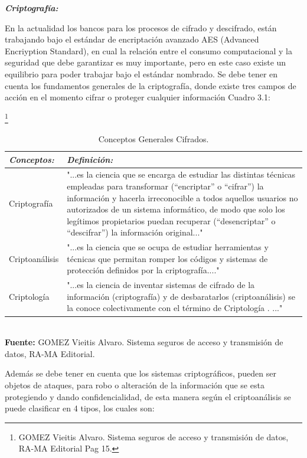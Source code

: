 \documentclass[a4paper,openright,12pt]{book}
\theoremstyle{definition}
\theoremstyle{remark}
\begin{document}
\textbf{\textit{Criptografía:}}

En la actualidad los bancos para los procesos de cifrado y descifrado, están trabajando bajo el estándar de encriptación avanzado AES (Advanced Encriyption Standard), en cual la relación entre el consumo computacional y la seguridad que debe garantizar es muy importante, pero en este caso existe un equilibrio para poder trabajar bajo el estándar nombrado. Se debe tener en cuenta los fundamentos generales de la criptografía, donde existe tres campos de acción en el momento cifrar o proteger cualquier información Cuadro 3.1: 

\begin{table}[ht]
\centering
\caption{Conceptos Generales Cifrados.}\footnote{GOMEZ Vieitis Alvaro. Sistema seguros de acceso y transmisión de datos, RA-MA Editorial Pag 15.}
\begin{tabular}{>{\centering\arraybackslash}m{3cm} >{\arraybackslash}m{9cm} }
\hline
\textbf{\textit{Conceptos:}} & \textbf{\textit{Definición:}} \\ \hline
Criptografía & "...es la ciencia que se encarga de estudiar las distintas técnicas empleadas para transformar (“encriptar” o “cifrar”) la información y hacerla irreconocible a todos aquellos usuarios no autorizados de un sistema informático, de modo que solo los legítimos propietarios puedan recuperar (“desencriptar” o “descifrar”) la información original..." \\ \hline
Criptoanálisis & "...es la ciencia que se ocupa de estudiar herramientas y técnicas que permitan romper los códigos y sistemas de protección definidos por la criptografía...." \\ \hline
Criptología & "...es la ciencia de inventar sistemas de cifrado de la información (criptografía) y de desbaratarlos (criptoanálisis) se la conoce colectivamente con el término de Criptología . ..." \\ \hline
\end{tabular}
\label{tabla:ConceptosCriptograficos}
\\\textbf{Fuente:} GOMEZ Vieitis Alvaro. Sistema seguros de acceso y transmisión de datos, RA-MA Editorial.
\end{table}

Además se debe tener en cuenta que los sistemas criptográficos, pueden ser objetos de ataques, para robo o alteración de la información que se esta protegiendo y dando confidencialidad, de esta manera según el criptoanálisis se puede clasificar en 4 tipos, los cuales son:
\end{document}
